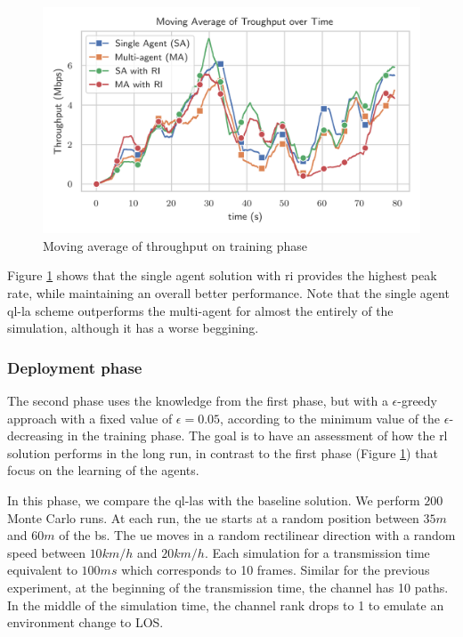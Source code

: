 \begin{figure}[!htbp]
	\centerline{\includegraphics[width=0.8\columnwidth]{figures/chp_la/training-sa-ma.png}}
	\caption{Moving average of throughput on training phase}
	\label{fig:la-train-thr}
\end{figure}

%


Figure \ref{fig:la-train-thr} shows that the single agent solution with \gls{ri} provides the highest peak rate, while maintaining an overall better performance.
%
Note that the single agent \gls{ql-la} scheme outperforms the multi-agent for almost the entirely of the simulation, although it has a worse beggining.

\subsubsection{Deployment phase}
The second phase uses the knowledge from the first phase, but with a $\epsilon$-greedy approach with a fixed value of $\epsilon = 0.05$, according to the minimum value of the $\epsilon$-decreasing in the training phase.
%
The goal is to have an assessment of how the \gls{rl} solution performs in the long run, in contrast to the first phase (Figure \ref{fig:la-train-thr}) that focus on the learning of the agents.
%

In this phase, we compare the \glspl{ql-la} with the baseline solution.
%
We perform $200$ Monte Carlo runs. At each run, the \gls{ue} starts at a random position between $35m$ and $60m$ of the \gls{bs}.
%
The \gls{ue} moves in a random rectilinear direction with a random speed between $10km/h$ and $20km/h$. Each simulation for a transmission time equivalent to $100ms$ which corresponds to 10 frames.
%
Similar for the previous experiment, at the beginning of the transmission time, the channel has 10 paths.
%
In the middle of the simulation time, the channel rank drops to 1 to emulate an environment change to LOS.
%

